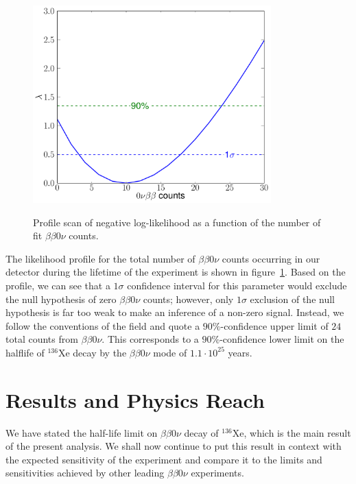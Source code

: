 \begin{figure}
\begin{center}
\includegraphics[keepaspectratio=true,height=3in]{0nubb_profile_frompaper.pdf}
\end{center}
\renewcommand{\baselinestretch}{1}
\small\normalsize
\begin{quote}
\caption{Profile scan of negative log-likelihood as a function of the number of fit $\beta\beta 0\nu$ counts.~\cite{NewEXObb0nPaper_2014}}
\label{fig:bb0nProfileFromPaper}
\end{quote}
\end{figure}
\renewcommand{\baselinestretch}{2}
\small\normalsize

The likelihood profile for the total number of $\beta\beta 0\nu$ counts occurring in our detector during the lifetime of the experiment is shown in figure~\ref{fig:bb0nProfileFromPaper}.  Based on the profile, we can see that a $1\sigma$ confidence interval for this parameter would exclude the null hypothesis of zero $\beta\beta 0\nu$ counts; however, only $1\sigma$ exclusion of the null hypothesis is far too weak to make an inference of a non-zero signal.  Instead, we follow the conventions of the field and quote a $90\%$-confidence upper limit of $24$ total counts from $\beta\beta 0\nu$.  This corresponds to a $90\%$-confidence lower limit on the halflife of $^{136}$Xe decay by the $\beta\beta 0\nu$ mode of $1.1 \cdot 10^{25}$ years.~\cite{NewEXObb0nPaper_2014}

\section{Results and Physics Reach}\label{sec:ResultResults}

We have stated the half-life limit on $\beta\beta 0\nu$ decay of $^{136}$Xe, which is the main result of the present analysis.  We shall now continue to put this result in context with the expected sensitivity of the experiment and compare it to the limits and sensitivities achieved by other leading $\beta\beta 0\nu$ experiments.

